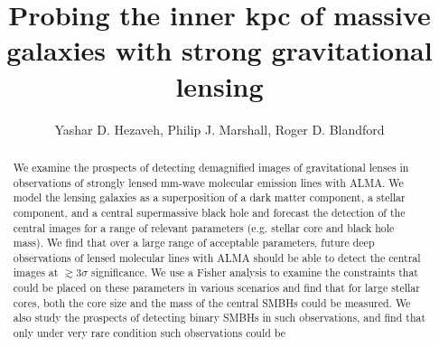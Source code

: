 \documentclass[chicago]{emulateapj}
\begin{document}
\title{Probing the inner kpc of massive galaxies with strong gravitational lensing}
\author{Yashar D. Hezaveh, Philip J. Marshall, Roger D. Blandford}  

\begin{abstract}  
\noindent
We examine the prospects of detecting demagnified images of gravitational lenses in observations of strongly lensed mm-wave molecular emission lines with ALMA. We model the lensing galaxies as a superposition of a dark matter component, a stellar component, and a central supermassive black hole and forecast the detection of the central images for a range of relevant parameters (e.g. stellar core and black hole mass).
We find that over a large range of acceptable parameters, future deep observations of lensed molecular lines with ALMA should be able to detect the central images at $\gtrsim 3\sigma$ significance. We use a Fisher analysis to examine the  constraints that could be placed on these parameters in various scenarios and find that for large stellar cores, both the core size and the mass of the central SMBHs could be measured. We also study the prospects of detecting binary SMBHs in such observations, and find that only under very rare condition such observations could be 

\end{abstract}



\end{document}
